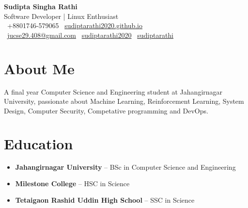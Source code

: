 \documentclass[a4paper,10pt]{article}
\begin{document}
\begin{minipage}{0.70\textwidth}
    {\LARGE\bfseries Sudipta Singha Rathi}\\[0.5em]
    {\large Software Developer | Linux Enthusiast}\\[0.5em]
    \faPhone \ +8801746-579065 \quad
    \faGlobe \ \href{https://sudiptarathi2020.github.io}{sudiptarathi2020.github.io}\\
    \faEnvelope \ \href{mailto:jucse29.408@gmail.com}{jucse29.408@gmail.com} 
    \faGithub \ \href{https://github.com/sudiptarathi2020}{sudiptarathi2020}
    \faLinkedin \ \href{https://www.linkedin.com/in/sudiptarathi/}{sudiptarathi} \quad
    
\end{minipage}%
\hfill
\begin{minipage}{0.30\textwidth}
    \raggedleft
\end{minipage}

\vspace{1em}

\section*{About Me}
A final year Computer Science and Engineering student at Jahangirnagar University, passionate about Machine Learning, Reinforcement Learning, System Design, Computer Security, Competative programming and DevOps.

\section*{Education}
\begin{itemize}[leftmargin=0.5cm]
    \item \textbf{Jahangirnagar University} – BSc in Computer Science and Engineering
    \item \textbf{Milestone College} – HSC in Science
    \item \textbf{Tetaigaon Rashid Uddin High School} – SSC in Science
\end{itemize}
\end{document}
